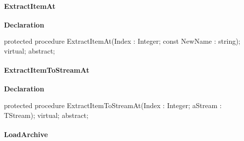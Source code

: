 \documentclass{report}
\newif\ifpdf
\begin{document}
\paragraph*{ExtractItemAt}\hspace*{\fill}

\label{AbArcTyp.TAbArchive-ExtractItemAt}
\begin{list}{}{
\setlength{\itemindent}{0cm}
\setlength{\listparindent}{0cm}
\setlength{\leftmargin}{\evensidemargin}
\addtolength{\leftmargin}{\tmplength}
\settowidth{\labelsep}{X}
\addtolength{\leftmargin}{\labelsep}
\setlength{\labelwidth}{\tmplength}
}
\item[\textbf{Declaration}\hfill]
\ifpdf
\begin{flushleft}
\fi
\begin{ttfamily}
protected procedure ExtractItemAt(Index : Integer; const NewName : string); virtual; abstract;\end{ttfamily}

\ifpdf
\end{flushleft}
\fi

\end{list}
\paragraph*{ExtractItemToStreamAt}\hspace*{\fill}

\label{AbArcTyp.TAbArchive-ExtractItemToStreamAt}
\begin{list}{}{
\setlength{\itemindent}{0cm}
\setlength{\listparindent}{0cm}
\setlength{\leftmargin}{\evensidemargin}
\addtolength{\leftmargin}{\tmplength}
\settowidth{\labelsep}{X}
\addtolength{\leftmargin}{\labelsep}
\setlength{\labelwidth}{\tmplength}
}
\item[\textbf{Declaration}\hfill]
\ifpdf
\begin{flushleft}
\fi
\begin{ttfamily}
protected procedure ExtractItemToStreamAt(Index : Integer; aStream : TStream); virtual; abstract;\end{ttfamily}

\ifpdf
\end{flushleft}
\fi

\end{list}
\paragraph*{LoadArchive}\hspace*{\fill}
\end{document}
